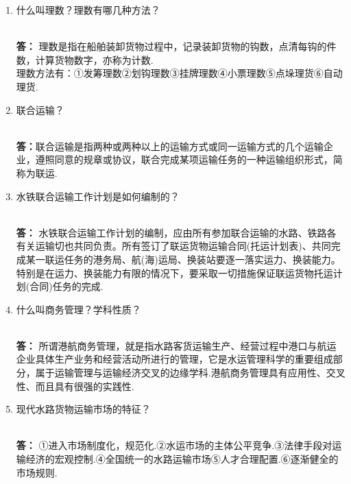 \documentclass[UTF8]{ctexart}
\begin{document}
\begin{enumerate}[1]
\begin{CJK}{UTF8}{you}
\end{CJK}
\\ \textbf{答：} 理残：在船舶装卸过程中，对残损货物应作好记录，把原残货物的积载部位、残损程度和数量记录在现场记录和残损单上，并通知船方当班复验和签认，称为理残.
\\ 工残与原残：对于出口货物，在装船前发现的残损称为原残，在装船过程中造成的残损称为工残.对于进口货物，在船上发现残损称为原残，在卸船过程中造成的残损称为工残.
\item \begin{CJK}{UTF8}{you} 什么叫理数？理数有哪几种方法？
\end{CJK}
\\ \textbf{答：} 理数是指在船舶装卸货物过程中，记录装卸货物的钩数，点清每钩的件数，计算货物数字，亦称为计数.
\\ 理数方法有：①发筹理数②划钩理数③挂牌理数④小票理数⑤点垛理货⑥自动理货.
\item \begin{CJK}{UTF8}{you} 联合运输？
\end{CJK}
\\ \textbf{答：}联合运输是指两种或两种以上的运输方式或同一运输方式的几个运输企业，遵照同意的规章或协议，联合完成某项运输任务的一种运输组织形式，简称为联运.
\item \begin{CJK}{UTF8}{you} 水铁联合运输工作计划是如何编制的？
\end{CJK}
\\ \textbf{答：} 水铁联合运输工作计划的编制，应由所有参加联合运输的水路、铁路各有关运输切也共同负责。所有签订了联运货物运输合同(托运计划表)、共同完成某一联运任务的港务局、航(海)运局、换装站要逐一落实运力、换装能力。特别是在运力、换装能力有限的情况下，要采取一切措施保证联运货物托运计划(合同)任务的完成.
\item \begin{CJK}{UTF8}{you} 什么叫商务管理？学科性质？\end{CJK}
\\ \textbf{答：} 所谓港航商务管理，就是指水路客货运输生产、经营过程中港口与航运企业具体生产业务和经营活动所进行的管理，它是水运管理科学的重要组成部分，属于运输管理与运输经济交叉的边缘学科.港航商务管理具有应用性、交叉性、而且具有很强的实践性.
\item \begin{CJK}{UTF8}{you} 现代水路货物运输市场的特征？\end{CJK}
\\ \textbf{答：} ①进入市场制度化，规范化.②水运市场的主体公平竞争.③法律手段对运输经济的宏观控制.④全国统一的水路运输市场⑤人才合理配置.⑥逐渐健全的市场规则.

\end{enumerate}
\end{document}
